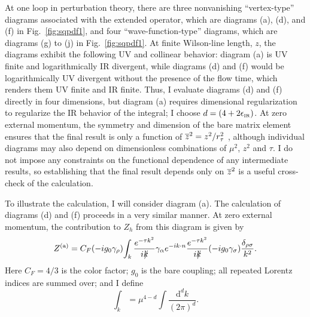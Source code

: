 At one loop in perturbation theory, there are three nonvanishing ``vertex-type'' diagrams associated with the extended operator, which are diagrams (a), (d), and (f) in Fig.~\ref{fig:sqpdf1}, and four ``wave-function-type'' diagrams, which are diagrams (g) to (j) in Fig.~\ref{fig:sqpdf1}. At finite Wilson-line length, $z$, the diagrams exhibit the following UV and collinear behavior: diagram (a) is UV finite and logarithmically IR divergent, while diagrams (d) and (f) would be logarithmically UV divergent without the presence of the flow time, which renders them UV finite and IR finite. Thus, I evaluate diagrams (d) and (f) directly in four dimensions, but diagram (a) requires dimensional regularization to regularize the IR behavior of the integral; I choose $d = (4+2\epsilon_{\scriptscriptstyle\mathrm{IR}})$.  At zero external momentum, the symmetry and dimension of the bare matrix element ensures that the final result is only a function of $\overline{z}^2=z^2/r_\tau^2$ \cite{Radyushkin:2016hsy}, although individual diagrams may also depend on dimensionless combinations of $\mu^2$, $z^2$ and $\tau$. I do not impose any constraints on the functional dependence of any intermediate results, so establishing that the final result depends only on $\overline{z}^2$ is a useful cross-check of the calculation.

To illustrate the calculation, I will consider diagram (a). The calculation of diagrams (d) and (f) proceeds in a very similar manner. At zero external momentum, the contribution to $Z_h$ from this diagram is given by
\begin{equation}
Z^{\mathrm{(a)}} = C_F (-ig_0\gamma_\rho)\! \int_k \frac{e^{-\tau k^2}}{ik\!\!\!/}\gamma_\alpha e^{-ik\cdot n} \frac{e^{-\tau k^2}}{ik\!\!\!/}(-ig_0\gamma_\sigma)\frac{\delta_{\rho\sigma}}{k^2}.
\end{equation}
Here $C_F = 4/3$ is the color factor; $g_0$ is the bare coupling; all repeated Lorentz indices are summed over; and I define
\begin{equation}
\int_k = \mu^{4-d}\int \frac{\mathrm{d}^dk}{(2\pi)^d}.
\end{equation}


